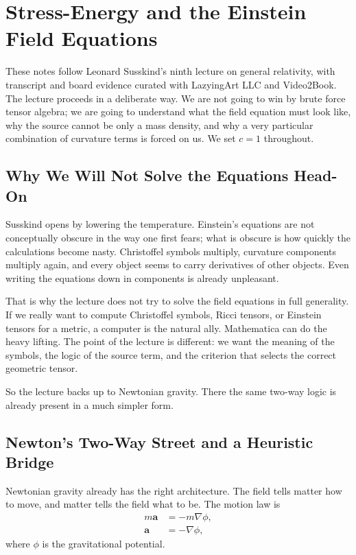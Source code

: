 \chapter{Stress-Energy and the Einstein Field Equations}

These notes follow Leonard Susskind's ninth lecture on general relativity, with transcript and board evidence curated with LazyingArt LLC and Video2Book. The lecture proceeds in a deliberate way. We are not going to win by brute force tensor algebra; we are going to understand what the field equation must look like, why the source cannot be only a mass density, and why a very particular combination of curvature terms is forced on us. We set \(c=1\) throughout.

\section{Why We Will Not Solve the Equations Head-On}

Susskind opens by lowering the temperature. Einstein's equations are not conceptually obscure in the way one first fears; what is obscure is how quickly the calculations become nasty. Christoffel symbols multiply, curvature components multiply again, and every object seems to carry derivatives of other objects. Even writing the equations down in components is already unpleasant.

That is why the lecture does not try to solve the field equations in full generality. If we really want to compute Christoffel symbols, Ricci tensors, or Einstein tensors for a metric, a computer is the natural ally. Mathematica can do the heavy lifting. The point of the lecture is different: we want the meaning of the symbols, the logic of the source term, and the criterion that selects the correct geometric tensor.

So the lecture backs up to Newtonian gravity. There the same two-way logic is already present in a much simpler form.

\section{Newton's Two-Way Street and a Heuristic Bridge}

Newtonian gravity already has the right architecture. The field tells matter how to move, and matter tells the field what to be. The motion law is
\begin{align}
m\mathbf a &= -m\nabla\phi,\\
\mathbf a &= -\nabla\phi,
\end{align}
where \(\phi\) is the gravitational potential.

